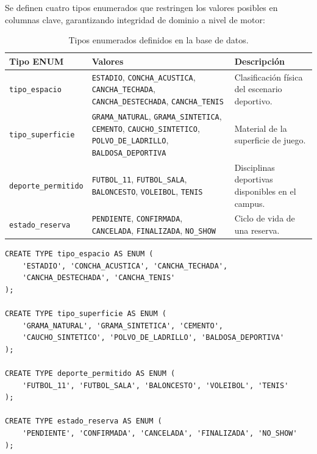 \documentclass[12pt, a4paper]{article}
\begin{document}
Se definen cuatro tipos enumerados que restringen los valores posibles en columnas clave, garantizando integridad de dominio a nivel de motor:

\begin{table}[H]
\centering
\renewcommand{\arraystretch}{1.3}
\begin{tabularx}{\textwidth}{l l X}
    \toprule
    \textbf{Tipo ENUM} & \textbf{Valores} & \textbf{Descripción} \\
    \midrule
    \texttt{tipo\_espacio} &
        \texttt{ESTADIO}, \texttt{CONCHA\_ACUSTICA}, \texttt{CANCHA\_TECHADA}, \texttt{CANCHA\_DESTECHADA}, \texttt{CANCHA\_TENIS} &
        Clasificación física del escenario deportivo. \\
    \addlinespace
    \texttt{tipo\_superficie} &
        \texttt{GRAMA\_NATURAL}, \texttt{GRAMA\_SINTETICA}, \texttt{CEMENTO}, \texttt{CAUCHO\_SINTETICO}, \texttt{POLVO\_DE\_LADRILLO}, \texttt{BALDOSA\_DEPORTIVA} &
        Material de la superficie de juego. \\
    \addlinespace
    \texttt{deporte\_permitido} &
        \texttt{FUTBOL\_11}, \texttt{FUTBOL\_SALA}, \texttt{BALONCESTO}, \texttt{VOLEIBOL}, \texttt{TENIS} &
        Disciplinas deportivas disponibles en el campus. \\
    \addlinespace
    \texttt{estado\_reserva} &
        \texttt{PENDIENTE}, \texttt{CONFIRMADA}, \texttt{CANCELADA}, \texttt{FINALIZADA}, \texttt{NO\_SHOW} &
        Ciclo de vida de una reserva. \\
    \bottomrule
\end{tabularx}
\caption{Tipos enumerados definidos en la base de datos.}
\end{table}

\begin{lstlisting}[caption={Definición de tipos enumerados en SQL.}]
CREATE TYPE tipo_espacio AS ENUM (
    'ESTADIO', 'CONCHA_ACUSTICA', 'CANCHA_TECHADA',
    'CANCHA_DESTECHADA', 'CANCHA_TENIS'
);

CREATE TYPE tipo_superficie AS ENUM (
    'GRAMA_NATURAL', 'GRAMA_SINTETICA', 'CEMENTO',
    'CAUCHO_SINTETICO', 'POLVO_DE_LADRILLO', 'BALDOSA_DEPORTIVA'
);

CREATE TYPE deporte_permitido AS ENUM (
    'FUTBOL_11', 'FUTBOL_SALA', 'BALONCESTO', 'VOLEIBOL', 'TENIS'
);

CREATE TYPE estado_reserva AS ENUM (
    'PENDIENTE', 'CONFIRMADA', 'CANCELADA', 'FINALIZADA', 'NO_SHOW'
);
\end{lstlisting}
\end{document}
